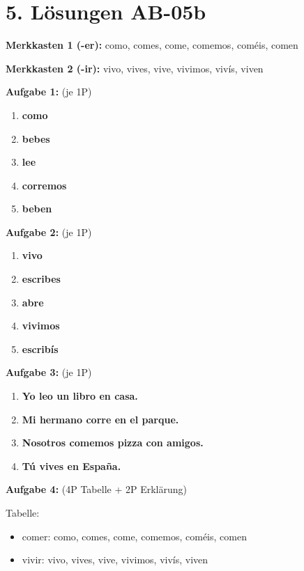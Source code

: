 \documentclass[11pt, a4paper]{article}
\newcommand{\lsg}[1]{\textcolor{loesung}{\textbf{#1}}}
\begin{document}

\section*{5. Lösungen AB-05b}

\textbf{Merkkasten 1 (-er):}
como, comes, come, comemos, coméis, comen

\textbf{Merkkasten 2 (-ir):}
vivo, vives, vive, vivimos, vivís, viven

\vspace{0.5em}

\textbf{Aufgabe 1:} (je 1P)
\begin{enumerate}[label=\alph*)]
    \item \lsg{como}
    \item \lsg{bebes}
    \item \lsg{lee}
    \item \lsg{corremos}
    \item \lsg{beben}
\end{enumerate}

\textbf{Aufgabe 2:} (je 1P)
\begin{enumerate}[label=\alph*)]
    \item \lsg{vivo}
    \item \lsg{escribes}
    \item \lsg{abre}
    \item \lsg{vivimos}
    \item \lsg{escribís}
\end{enumerate}

\textbf{Aufgabe 3:} (je 1P)
\begin{enumerate}[label=\alph*)]
    \item \lsg{Yo leo un libro en casa.}
    \item \lsg{Mi hermano corre en el parque.}
    \item \lsg{Nosotros comemos pizza con amigos.}
    \item \lsg{Tú vives en España.}
\end{enumerate}

\textbf{Aufgabe 4:} (4P Tabelle + 2P Erklärung)

Tabelle:
\begin{itemize}
    \item comer: como, comes, come, comemos, coméis, comen
    \item vivir: vivo, vives, vive, vivimos, vivís, viven
\end{itemize}
\end{document}
